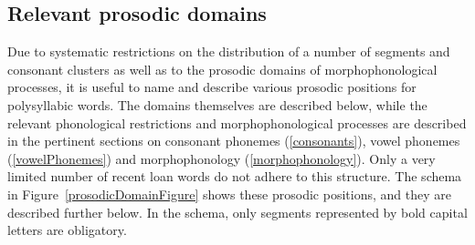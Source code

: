 \subsection{Relevant prosodic domains}\label{prosodicDomains}
Due to systematic restrictions on the distribution of a number of segments and consonant clusters as well as to the prosodic domains of morphophonological processes, it is useful to name and describe various prosodic positions for polysyllabic words. The domains themselves are described below, while the relevant phonological restrictions and morphophonological processes are described in the pertinent sections on consonant phonemes (\SEC\ref{consonants}), vowel phonemes (\SEC\ref{vowelPhonemes}) and morphophonology (\SEC\ref{morphophonology}). Only a very limited number of recent loan words do not adhere to this structure. 
The schema in Figure~\vref{prosodicDomainFigure} shows these prosodic positions, and they are described further below. In the schema, only segments represented by bold capital letters are obligatory.
\newcommand{\Cyes}{\Bf{C}}
\newcommand{\Cno}{c}
\newcommand{\Vyes}{\Bf{V}}
\newcommand{\Vno}{v}
